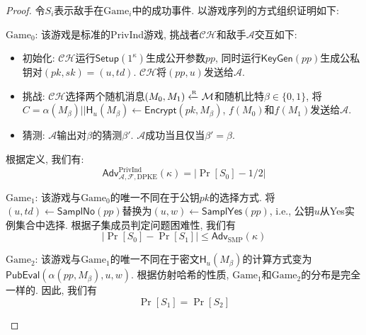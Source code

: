 \begin{proof}
令$S_i$表示敌手在$\text{Game}_i$中的成功事件. 以游戏序列的方式组织证明如下: 
\begin{trivlist}
\item $\text{Game}_0$: 该游戏是标准的PrivInd游戏, 挑战者$\mathcal{CH}$和敌手$\mathcal{A}$交互如下: 
\begin{itemize}
\item 初始化: $\mathcal{CH}$运行$\mathsf{Setup}(1^\kappa)$生成公开参数$pp$, 
		同时运行$\mathsf{KeyGen}(pp)$生成公私钥对$(pk, sk) = (u, td)$. $\mathcal{CH}$将$(pp, u)$发送给$\mathcal{A}$. 

\item 挑战: $\mathcal{CH}$选择两个随机消息$(M_0, M_1) \xleftarrow{\textup{\tiny R}} \mathcal{M}$和随机比特$\beta \in \{0,1\}$, 将$C = \alpha(M_\beta)||\mathsf{H}_u(M_\beta) \leftarrow \mathsf{Encrypt}(pk, M_\beta)$, $f(M_0)$和$f(M_1)$发送给$\mathcal{A}$.

\item 猜测: $\mathcal{A}$输出对$\beta$的猜测$\beta'$. $\mathcal{A}$成功当且仅当$\beta' = \beta$. 
\end{itemize} 
根据定义, 我们有: 
\[
	\mathsf{Adv}_{\mathcal{A}, \mathcal{F}, \text{DPKE}}^{\text{PrivInd}}(\kappa) = |\Pr[S_0] - 1/2|
\]

\item $\text{Game}_1$: 该游戏与$\text{Game}_0$的唯一不同在于公钥$pk$的选择方式. 将$(u, td) \leftarrow \mathsf{SamplNo}(pp)$替换为$(u, w) \leftarrow \mathsf{SamplYes}(pp)$, i.e., 公钥$u$从Yes实例集合中选择. 根据子集成员判定问题困难性, 我们有
\[
|\Pr[S_0] - \Pr[S_1]| \leq \mathsf{Adv}_{\text{SMP}}(\kappa)
\]

\item $\text{Game}_2$: 该游戏与$\text{Game}_1$的唯一不同在于密文$\mathsf{H}_u(M_\beta)$的计算方式变为$\mathsf{PubEval}(\alpha(pp, M_\beta), u, w)$. 根据仿射哈希的性质, $\text{Game}_1$和$\text{Game}_2$的分布是完全一样的. 因此, 我们有
\[
\Pr[S_1] = \Pr[S_2]
\]


\end{trivlist}
\end{proof}
